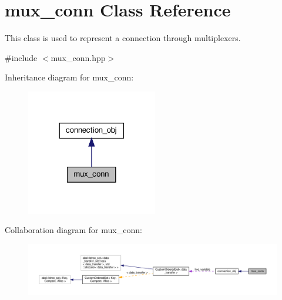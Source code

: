 \hypertarget{classmux__conn}{}\section{mux\+\_\+conn Class Reference}
\label{classmux__conn}


This class is used to represent a connection through multiplexers.  




{\ttfamily \#include $<$mux\+\_\+conn.\+hpp$>$}



Inheritance diagram for mux\+\_\+conn\+:
\nopagebreak
\begin{figure}[H]
\begin{center}
\leavevmode
\includegraphics[width=162pt]{da/d8f/classmux__conn__inherit__graph}
\end{center}
\end{figure}


Collaboration diagram for mux\+\_\+conn\+:
\nopagebreak
\begin{figure}[H]
\begin{center}
\leavevmode
\includegraphics[width=350pt]{d1/d4c/classmux__conn__coll__graph}
\end{center}
\end{figure}
